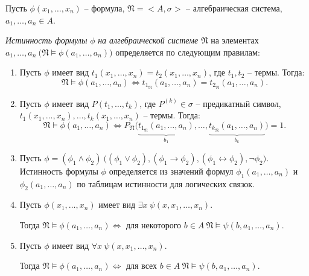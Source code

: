 \begin{definition}
    Пусть $ \phi(x_1,\ldots,x_n) $ -- формула, $ \mathfrak{N} = <A,\sigma> $ -- алгебраическая система,\\$ a_1,\ldots,a_n \in A $.

        \emph{Истинность формулы} $ \phi $ \emph{на алгебраической системе} $ \mathfrak{N} $ на элементах $ a_1,\ldots,a_n \ \big(\mathfrak{N} \vDash \phi(a_1,\ldots,a_n)\big) $ определяется по следующим правилам:
    \begin{enumerate}
        \item Пусть $ \phi $ имеет вид $ t_1(x_1,\ldots,x_n) = t_2(x_1,\ldots,x_n) $, где $ t_1,t_2 $ -- термы. Тогда:
              \[
                  \mathfrak{N} \vDash \phi(a_1,\ldots,a_n)\iff t_{1_\mathfrak{N}}(a_1,\ldots,a_n) = t_{2_\mathfrak{N}} (a_1,\ldots,a_n).
              \]

        \item Пусть $ \phi $ имеет вид $ P(t_1,\ldots,t_k) $, где $ P^{(k)}\in \sigma $ -- предикатный символ, $ t_1(x_1,\ldots,x_n),\ldots,t_k(x_1,\ldots,x_n) $ -- термы. Тогда:
              \[
                  \mathfrak{N}\vDash \phi(a_1,\ldots,a_n) \iff P_\mathfrak{N}\big(\underbrace{t_{1_\mathfrak{N}}(a_1,\ldots,a_n)}_{b_1},\ldots,\underbrace{t_{k_\mathfrak{N}}(a_1,\ldots,a_n)}_{b_k}\big) = 1.
              \]

        \item Пусть $ \phi = (\phi_1 \land \phi_2) \ \big((\phi_1 \lor \phi_2),(\phi_1 \rightarrow \phi_2),(\phi_1 \leftrightarrow \phi_2),\lnot\phi_2\big) $. Истинность формулы $ \phi $ определяется из значений формул $ \phi_1(a_1,\ldots,a_n) $ и $ \phi_2(a_1,\ldots,a_n) $ по таблицам истинности для логических связок.

        \item Пусть $ \phi(x_1,\ldots,x_n) $ имеет вид $ \exists x \ \psi (x,x_1,\ldots,x_n) $.

              Тогда $ \mathfrak{N} \vDash \phi (a_1,\ldots,a_n) \iff $ для некоторого $ b \in A \ \mathfrak{N} \vDash \psi(b,a_1,\ldots,a_n) $.

        \item Пусть $ \phi $ имеет вид $ \forall x \ \psi(x,x_1,\ldots,x_n) $.

              Тогда $ \mathfrak{N} \vDash \phi(a_1,\ldots,a_n) \iff $ для всех $ b\in A \ \mathfrak{N}\vDash\psi(b,a_1,\ldots,a_n) $.
    \end{enumerate}
\end{definition}

